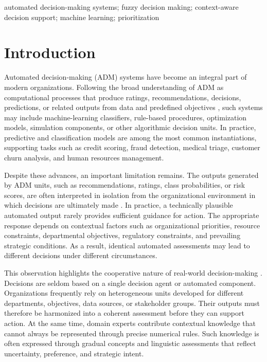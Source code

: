 \documentclass{interact}
\begin{document}
\begin{keywords}
automated decision-making systems; fuzzy decision making; context-aware decision support; machine learning; prioritization
\end{keywords}

\section{Introduction}\label{sec:intro}

Automated decision-making (ADM) systems have become an integral part of modern organizations. Following the broad understanding of ADM as computational processes that produce ratings, recommendations, decisions, predictions, or related outputs from data and predefined objectives \citep{EIP2022}, such systems may include machine-learning classifiers, rule-based procedures, optimization models, simulation components, or other algorithmic decision units. In practice, predictive and classification models are among the most common instantiations, supporting tasks such as credit scoring, fraud detection, medical triage, customer churn analysis, and human resources management.

Despite these advances, an important limitation remains. The outputs generated by ADM units, such as recommendations, ratings, class probabilities, or risk scores, are often interpreted in isolation from the organizational environment in which decisions are ultimately made \citep{Tariq2024a,Deliu2026}. In practice, a technically plausible automated output rarely provides sufficient guidance for action. The appropriate response depends on contextual factors such as organizational priorities, resource constraints, departmental objectives, regulatory constraints, and prevailing strategic conditions. As a result, identical automated assessments may lead to different decisions under different circumstances.

This observation highlights the cooperative nature of real-world decision-making \citep{Tariq2024a}. Decisions are seldom based on a single decision agent or automated component. Organizations frequently rely on heterogeneous units developed for different departments, objectives, data sources, or stakeholder groups. Their outputs must therefore be harmonized into a coherent assessment before they can support action. At the same time, domain experts contribute contextual knowledge that cannot always be represented through precise numerical rules. Such knowledge is often expressed through gradual concepts and linguistic assessments that reflect uncertainty, preference, and strategic intent.
\end{document}
